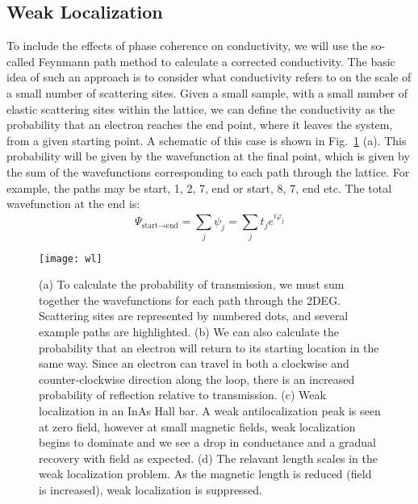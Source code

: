\subsection{Weak Localization}
\label{sec:wl}
To include the effects of phase coherence on conductivity, we will use the so-called Feynmann path method to calculate
a corrected conductivity. The basic idea of such an approach is to consider what conductivity refers to on the scale of
a small number of scattering sites. Given a small sample, with a small number of elastic scattering sites within the lattice,
we can define the conductivity as the probability that an electron reaches the end point, where it leaves the system,
from a given starting point. A schematic of this case is shown in Fig.~\ref{fig:WL} (a). This
probability will be given by the wavefunction at the final point, which is given by the sum of the wavefunctions corresponding
to each path through the lattice. For example, the paths may be {start, 1, 2, 7, end} or {start, 8, 7, end} etc. The total wavefunction at the end is:
\begin{equation}
  \Psi_{\textrm{start}\rightarrow\textrm{end}} = \sum_j \psi_j = \sum_j t_j e^{i \varphi_j}
\end{equation}

\begin{figure}
  \texttt{[image: wl]}
  \caption[Weak localization]
  {\label{fig:WL}(a) To calculate the probability of transmission, we must sum together the wavefunctions for each path through the 2DEG. Scattering
  sites are represented by numbered dots, and several example paths are highlighted.
  (b) We can also calculate the probability that an electron will return to its starting location in the same way. Since an electron can travel in both
  a clockwise and counter-clockwise direction along the loop, there is an increased probability of reflection relative to transmission.
  (c) Weak localization in an InAs Hall bar. A weak antilocalization peak is seen at zero field, however at small magnetic fields, weak localization
  begins to dominate and we see a drop in conductance and a gradual recovery with field as expected. (d) The relavant length scales in the weak
  localization problem. As the magnetic length is reduced (field is increased), weak localization is suppressed.}
\end{figure}

